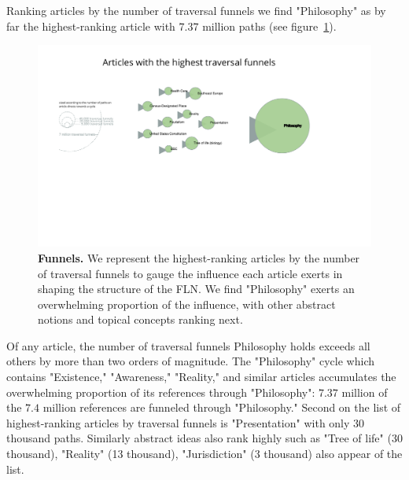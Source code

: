 \documentclass[pre,twocolumn,twoside,superscriptaddress,floatfix, aps, 10pt]{revtex4-1}
\begin{document}
Ranking articles by the number of traversal funnels we find 
"Philosophy" as by far the highest-ranking article with 
$7.37$ million paths
(see figure~\ref{fig:Funnels}).
\begin{figure}[tp!]
  \centering	
  \includegraphics[width=\textwidth]{graphics/funnels.pdf}
  \caption{
    \textbf{Funnels.}
    We represent the highest-ranking articles by the number of traversal 
    funnels to gauge the influence each article exerts in shaping the 
    structure of the FLN. We find "Philosophy" exerts an overwhelming proportion
    of the influence, with other abstract notions and topical concepts ranking
    next.
  }
  \label{fig:Funnels}
\end{figure}
Of any article, the number of traversal funnels Philosophy holds exceeds 
all others by more than two orders of magnitude.
The "Philosophy" cycle which contains "Existence," "Awareness," "Reality," 
and similar articles accumulates the overwhelming proportion of its 
references through "Philosophy": $7.37$ million of the $7.4$ million references
are funneled through "Philosophy."
Second on the list of highest-ranking articles by traversal funnels is 
"Presentation" with only $30$ thousand paths. Similarly abstract 
ideas also rank highly such as "Tree of life" (30 thousand), 
"Reality" (13 thousand), "Jurisdiction" (3 thousand) also appear of the list.
\end{document}
